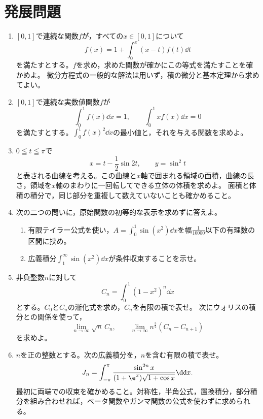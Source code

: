 \section{発展問題}\label{節:総合発展}

\begin{enumerate}[label=\textbf{\thechapter.\arabic*},leftmargin=*,start=13]
 \item\label{問:総合十三積分方程式}
 $[0,1]$で連続な関数$f$が，すべての$x\in[0,1]$について
 \[
  f(x)=1+\int_0^x(x-t)f(t)\dd t
 \]
 を満たすとする。$f$を求め，求めた関数が確かにこの等式を満たすことを確かめよ。
 微分方程式の一般的な解法は用いず，積の微分と基本定理から求めてよい。
 \item\label{問:総合十四二つの制約}
 $[0,1]$で連続な実数値関数$f$が
 \[
  \int_0^1f(x)\dd x=1,\qquad
  \int_0^1xf(x)\dd x=0
 \]
 を満たすとする。$\int_0^1f(x)^2\dd x$の最小値と，それを与える関数を求めよ。
 \item\label{問:総合十五媒介曲線}
 $0\leqq t\leqq\pi$で
 \[
  x=t-\frac12\sin2t,\qquad y=\sin^2t
 \]
 と表される曲線を考える。この曲線と$x$軸で囲まれる領域の面積，曲線の長さ，領域を$x$軸のまわりに一回転してできる立体の体積を求めよ。
 面積と体積の積分で，同じ部分を重複して数えていないことも確かめること。
 \item\label{問:総合十六近似と条件収束}
 次の二つの問いに，原始関数の初等的な表示を求めずに答えよ。
 \begin{enumerate}[label=(\arabic*),leftmargin=*]
  \item 有限テイラー公式を使い，$A=\int_0^1\sin(x^2)\dd x$を幅$\frac1{10000}$以下の有理数の区間に挟め。
  \item 広義積分$\int_1^{\infty}\sin(x^2)\dd x$が条件収束することを示せ。
 \end{enumerate}
 \item\label{問:総合十七ウォリス}
 非負整数$n$に対して
 \[
  C_n=\int_0^1(1-x^2)^n\dd x
 \]
 とする。$C_0$と$C_n$の漸化式を求め，$C_n$を有限の積で表せ。
 次にウォリスの積分との関係を使って，
 \[
  \lim_{n\to\infty}\sqrt n\,C_n,
  \qquad
  \lim_{n\to\infty}n^{\frac32}(C_n-C_{n+1})
 \]
 を求めよ。
 \item\label{問:総合十八相補と半角}
 $n$を正の整数とする。次の広義積分を，$n$を含む有限の積で表せ。
 \[
  J_n=\int_{-\pi}^{\pi}
  \frac{\sin^{2n}x}{(1+\e^x)\sqrt{1+\cos x}}\dd x.
 \]
 最初に両端での収束を確かめること。対称性，半角公式，置換積分，部分積分を組み合わせれば，ベータ関数やガンマ関数の公式を使わずに求められる。
\end{enumerate}

\clearpage
